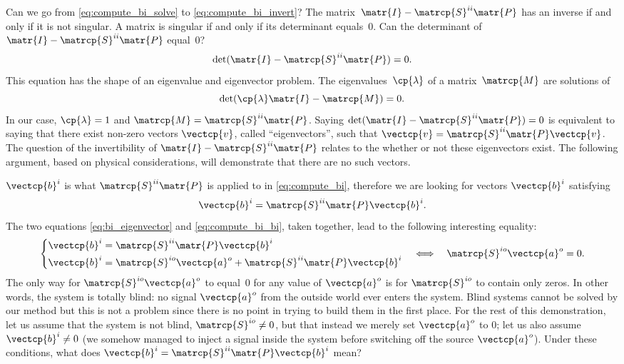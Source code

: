 Can we go from \cref{eq:compute_bi_solve} to \cref{eq:compute_bi_invert}?
The matrix~$\matr{I} - \matrcp{S}^{ii}\matr{P}$ has an inverse if and only if it is not singular.
A matrix is singular if and only if its determinant equals~0.
Can the determinant of~$\matr{I} - \matrcp{S}^{ii}\matr{P}$ equal~0?
\begin{equation}
    \det(\matr{I} - \matrcp{S}^{ii}\matr{P}) = 0
    \text{.}
    \label{eq:det_i_minus_siip}
\end{equation}
This equation has the shape of an eigenvalue and eigenvector problem.
The eigenvalues~$\cp{\lambda}$ of a matrix~$\matrcp{M}$ are solutions of
\begin{equation}
    \det(\cp{\lambda} \matr{I} - \matrcp{M}) = 0 \label{eq:eigenvalue_typical}
    \text{.}
\end{equation}
In our case, $\cp{\lambda}=1$ and $\matrcp{M}=\matrcp{S}^{ii}\matr{P}$.
Saying $\det(\matr{I} - \matrcp{S}^{ii}\matr{P}) = 0$ is equivalent to saying that there exist non-zero vectors $\vectcp{v}$, called ``eigenvectors'',
such that $\vectcp{v} = \matrcp{S}^{ii}\matr{P}\vectcp{v}$.
The question of the invertibility of $\matr{I} - \matrcp{S}^{ii}\matr{P}$ relates to the whether or not these eigenvectors exist.
The following argument, based on physical considerations, will demonstrate that there are no such vectors.

$\vectcp{b}^i$ is what $\matrcp{S}^{ii}\matr{P}$ is applied to in \cref{eq:compute_bi}, therefore we are looking for vectors $\vectcp{b}^i$ satisfying
\begin{equation}
    \vectcp{b}^i = \matrcp{S}^{ii}\matr{P} \vectcp{b}^i \text{.} \label{eq:bi_eigenvector}
\end{equation}
The two equations \cref{eq:bi_eigenvector} and  \cref{eq:compute_bi_bi}, taken together, 
lead to the following interesting equality:
\begin{equation}
    \left\lbrace
        \begin{aligned}
            \vectcp{b}^i &= \matrcp{S}^{ii}\matr{P} \vectcp{b}^i \\
            \vectcp{b}^i &= \matrcp{S}^{io}\vectcp{a}^o + \matrcp{S}^{ii}\matr{P} \vectcp{b}^i
        \end{aligned}
    \right.
    \quad
    \Longleftrightarrow
    \quad
    \matrcp{S}^{io}\vectcp{a}^o = 0
    \text{.}
\end{equation}
The only way for $\matrcp{S}^{io}\vectcp{a}^o$ to equal~0 for any value of $\vectcp{a}^o$ is for $\matrcp{S}^{io}$ to contain only zeros.
In other words, the system is totally blind: no signal $\vectcp{a}^o$ from the outside world ever enters the system.
Blind systems cannot be solved by our method but this is not a problem since there is no point in trying to build them in the first place.
For the rest of this demonstration, let us assume that the system is not blind, $\matrcp{S}^{io}\neq 0$, but that instead we merely set $\vectcp{a}^o$ to 0; let us also assume $\vectcp{b}^i \neq 0$ (we somehow managed to inject a signal inside the system before switching off the source $\vectcp{a}^o$).
Under these conditions, what does $\vectcp{b}^i = \matrcp{S}^{ii} \matr{P} \vectcp{b}^i$ mean?


